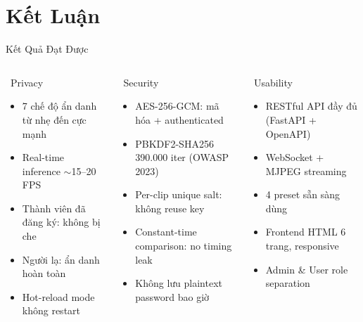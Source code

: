 \documentclass[aspectratio=169, 12pt]{beamer}
\newcommand{\cmark}{\textcolor{darkgreen}{\ding{51}}}
\begin{document}

\section{Kết Luận}

\begin{frame}{Kết Quả Đạt Được}
\begin{columns}[T]
\begin{block}{\cmark\ Privacy}
\begin{itemize}\footnotesize
  \item 7 chế độ ẩn danh từ nhẹ đến cực mạnh
  \item Real-time inference $\sim$15--20 FPS
  \item Thành viên đã đăng ký: không bị che
  \item Người lạ: ẩn danh hoàn toàn
  \item Hot-reload mode không restart
\end{itemize}
\end{block}

\begin{block}{\cmark\ Security}
\begin{itemize}\footnotesize
  \item AES-256-GCM: mã hóa + authenticated
  \item PBKDF2-SHA256 390.000 iter (OWASP 2023)
  \item Per-clip unique salt: không reuse key
  \item Constant-time comparison: no timing leak
  \item Không lưu plaintext password bao giờ
\end{itemize}
\end{block}

\begin{block}{\cmark\ Usability}
\begin{itemize}\footnotesize
  \item RESTful API đầy đủ (FastAPI + OpenAPI)
  \item WebSocket + MJPEG streaming
  \item 4 preset sẵn sàng dùng
  \item Frontend HTML 6 trang, responsive
  \item Admin \& User role separation
\end{itemize}
\end{block}


\end{columns}
\end{frame}
\end{document}
